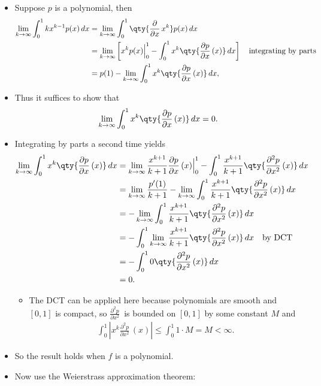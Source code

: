 \begin{solution}

\envlist

\begin{itemize}
\item
  Suppose \(p\) is a polynomial, then
  \begin{align*}
  \lim_{k\to\infty} \int_0^1 kx^{k-1} p(x) \, dx
  &= \lim_{k\to\infty} \int_0^1 \qty{ {\frac{\partial }{\partial x}\,}x^k } p(x) \, dx \\
  &= \lim_{k\to\infty} \left[ x^k p(x) \Big|_0^1 - \int_0^1 x^k \qty{{\frac{\partial p}{\partial x}\,}(x) } \, dx \right] \quad\text{integrating by parts}\\
  &= p(1) - \lim_{k\to\infty} \int_0^1 x^k \qty{{\frac{\partial p}{\partial x}\,}(x) } \, dx
  ,\end{align*}
\item
  Thus it suffices to show that
  \begin{align*}
  \lim_{k\to\infty} \int_0^1 x^k \qty{{\frac{\partial p}{\partial x}\,} (x) } \, dx = 0
  .\end{align*}
\item
  Integrating by parts a second time yields
  \begin{align*}
  \lim_{k\to\infty} 
  \int_0^1 x^k \qty{{\frac{\partial p}{\partial x}\,}(x) } \, dx
  &= \lim_{k\to\infty} 
  {x^{k+1} \over k+1} {\frac{\partial p}{\partial x}\,}(x) \Big|_0^1 - \int_0^1 {x^{k+1} \over k+1} \qty{ {\frac{\partial ^2 p}{\partial x^2}\,}(x)} \, dx \\
  &= \lim_{k\to\infty} {p'(1) \over k+1} - \lim_{k\to\infty} \int_0^1 {x^{k+1} \over k+1} \qty{ {\frac{\partial ^2p}{\partial x^2}\,}(x)} \, dx \\
  &= - \lim_{k\to\infty} \int_0^1 {x^{k+1} \over k+1} \qty{ {\frac{\partial ^2p}{\partial x^2}\,}(x)} \, dx \\
  &= - \int_0^1 \lim_{k\to\infty}  {x^{k+1} \over k+1} \qty{ {\frac{\partial ^2p}{\partial x^2}\,}(x)} \, dx \quad\text{by DCT} \\
  &= - \int_0^1 0 \qty{ {\frac{\partial ^2p}{\partial x^2}\,}(x)} \, dx \\
  &= 0
  .\end{align*}

  \begin{itemize}
  \tightlist
  \item
    The DCT can be applied here because polynomials are smooth and
    \([0, 1]\) is compact, so \({\frac{\partial ^2 p}{\partial x^2}\,}\)
    is bounded on \([0, 1]\) by some constant \(M\) and
    \begin{align*} \int_0^1 {\left\lvert {x^k {\frac{\partial ^2 p}{\partial x^2}\,} (x)} \right\rvert} \leq \int_0^1 1\cdot M = M < \infty.\end{align*}
  \end{itemize}
\item
  So the result holds when \(f\) is a polynomial.
\item
  Now use the Weierstrass approximation theorem:


\end{itemize}
\end{solution}
